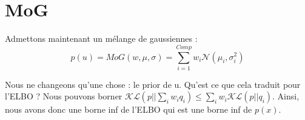 \documentclass{article}
\begin{document}
\section{MoG}

Admettons maintenant un mélange de gaussiennes :
\begin{equation}
    p(u) = MoG(w, \mu, \sigma) = \sum_{i=1}^{Comp} w_i \mathcal{N}(\mu_i,\sigma_i^2)
\end{equation}

Nous ne changeons qu'une chose : le prior de u.
Qu'est ce que cela traduit pour l'ELBO ? 
Nous pouvons borner $\mathcal{KL}(p||\sum_i w_i q_i) \leq \sum_i w_i \mathcal{KL}(p||q_i)$. Ainsi, nous avons donc une borne inf de l'ELBO qui est une borne inf de $p(x)$.
\end{document}
